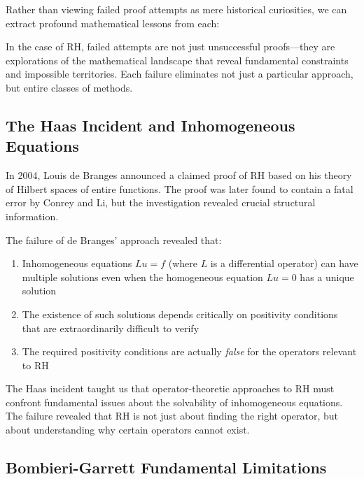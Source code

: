 Rather than viewing failed proof attempts as mere historical curiosities, we can extract profound mathematical lessons from each:

\begin{insight}
In the case of RH, failed attempts are not just unsuccessful proofs—they are explorations of the mathematical landscape that reveal fundamental constraints and impossible territories. Each failure eliminates not just a particular approach, but entire classes of methods.
\end{insight}

\subsection{The Haas Incident and Inhomogeneous Equations}
\label{subsec:haas_incident}

In 2004, Louis de Branges announced a claimed proof of RH based on his theory of Hilbert spaces of entire functions. The proof was later found to contain a fatal error by Conrey and Li, but the investigation revealed crucial structural information.

\begin{theorem}
The failure of de Branges' approach revealed that:
\begin{enumerate}
\item Inhomogeneous equations $Lu = f$ (where $L$ is a differential operator) can have multiple solutions even when the homogeneous equation $Lu = 0$ has a unique solution
\item The existence of such solutions depends critically on positivity conditions that are extraordinarily difficult to verify
\item The required positivity conditions are actually \emph{false} for the operators relevant to RH
\end{enumerate}
\end{theorem}

\begin{lesson}
The Haas incident taught us that operator-theoretic approaches to RH must confront fundamental issues about the solvability of inhomogeneous equations. The failure revealed that RH is not just about finding the right operator, but about understanding why certain operators cannot exist.
\end{lesson}

\subsection{Bombieri-Garrett Fundamental Limitations}
\label{subsec:bombieri_garrett_lessons}

